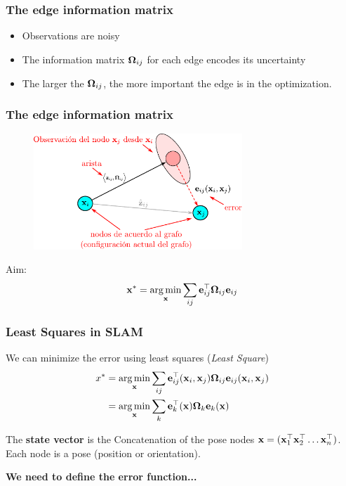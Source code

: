    \begin{frame}
   \frametitle{The edge information matrix}
   \begin{itemize}
   \item Observations are noisy
   \item The information matrix $\boldsymbol{\mathbf{\Omega}}_{ij}$ for each edge encodes its uncertainty
   \item The larger the $\boldsymbol{\mathbf{\Omega}}_{ij}$, the more important the edge is in the optimization.
   \end{itemize}
   
   \end{frame}
   
   \begin{frame}
    \frametitle{The edge information matrix}
    \begin{figure}[!h]
    \includegraphics[width=0.7\textwidth]{images/factor_graph_edge_example.pdf}
    \end{figure}
   
    Aim:
    \begin{equation*}
    \boldsymbol{\mathbf{x}}^{*} = \operatorname*{arg\,min}_{\boldsymbol{\mathbf{x}}} \sum _{ij} \boldsymbol{\mathbf{e}}^{\top}_{ij} \boldsymbol{\mathbf{\Omega}}_{ij} \boldsymbol{\mathbf{e}}_{ij}
    \end{equation*}
   
\end{frame}



\begin{frame}
    \frametitle{Least Squares in SLAM}
    We can minimize the error using least squares (\emph{Least Square})
    \begin{align*}
    x^{*} &= \operatorname*{arg\,min}_{\boldsymbol{\mathbf{x}}} \sum_{ij} \boldsymbol{\mathbf{e}}^{\top}_{ij}(\boldsymbol{\mathbf{x}}_{i},\boldsymbol{\mathbf{x}}_{j}) \boldsymbol{\mathbf{\Omega}}_{ij} \boldsymbol{\mathbf{e}}_{ij}(\boldsymbol{\mathbf{x}}_{i},\boldsymbol{\mathbf{x}}_{j})\\
    &= \operatorname*{arg\,min}_{\boldsymbol{\mathbf{x}}} \sum_{k} \boldsymbol{\mathbf{e}}^{\top}_{k}(\boldsymbol{\mathbf{x}}) \boldsymbol{\mathbf{\Omega}}_{k} \boldsymbol{\mathbf{e}}_{k}(\boldsymbol{\mathbf{x}})
    \end{align*}
    
    The {\bf state vector} is the Concatenation of the pose nodes $\stateBold = (\stateBold_{1}^{\top} \stateBold_{2}^{\top} \dots \stateBold_{n}^{\top})$. Each node is a pose (position or orientation).
    
    \vspace{2em}
    {\bf We need to define the error function...}
    \end{frame}
    
